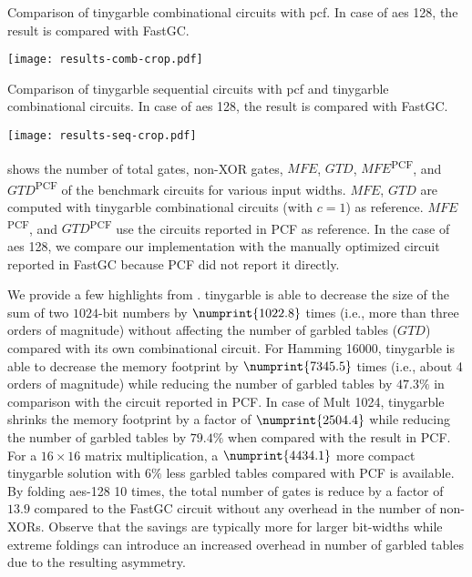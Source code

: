 \begin{table*}
\centering
\caption{Comparison of \gls{tinygarble} combinational circuits with \gls{pcf}.
In case of \acrshort{aes} 128, the result is compared with FastGC.}
\label{table:result-comb}
\texttt{[image: results-comb-crop.pdf]}
\end{table*}

\begin{table*}
\centering
\caption{Comparison of \gls{tinygarble} sequential circuits with \gls{pcf} and \gls{tinygarble} combinational circuits.
In case of \acrshort{aes} 128, the result is compared with FastGC.}
\label{table:result-seq}
\texttt{[image: results-seq-crop.pdf]}
\end{table*}

 shows the number of total gates, non-XOR gates, $\mathit{MFE}$, $\mathit{GTD}$, $\mathit{MFE}$\textsuperscript{PCF}, and $\mathit{GTD}$\textsuperscript{PCF} of the benchmark circuits for various input widths.
$\mathit{MFE}$, $\mathit{GTD}$ are computed with \gls{tinygarble} combinational circuits (with $c=1$) as reference.
$\mathit{MFE}$\textsuperscript{PCF}, and $\mathit{GTD}$\textsuperscript{PCF} use the circuits reported in PCF as reference.
In the case of \acrshort{aes} 128, we compare our implementation with the manually optimized circuit reported in FastGC \cite{huang2011faster} because PCF did not report it directly.

We provide a few highlights from .
\gls{tinygarble} is able to decrease the size of the sum of two $1024$-bit numbers by $\numprint{1022.8}$ times (i.e., more than three orders of magnitude) without affecting the number of garbled tables ($\mathit{GTD}$) compared with its own combinational circuit.
For Hamming 16000, \gls{tinygarble} is able to decrease the memory footprint by $\numprint{7345.5}$ times (i.e., about 4 orders of magnitude) while reducing the number of garbled tables by $47.3\%$ in comparison with the circuit reported in PCF.
In case of Mult 1024, \gls{tinygarble} shrinks the memory footprint by a factor of $\numprint{2504.4}$ while reducing the number of garbled tables by $79.4\%$ when compared with the result in PCF.
For a $16\times 16$ matrix multiplication, a $\numprint{4434.1}$ more compact \gls{tinygarble} solution with $6\%$ less garbled tables compared with PCF is available.
By folding \acrshort{aes}-128 10 times, the total number of gates is reduce by a factor of $13.9$ compared to the  FastGC circuit without any overhead in the number of non-XORs.
Observe that the savings are typically more for larger bit-widths while extreme foldings can introduce an increased overhead in number of garbled tables due to the resulting asymmetry.


